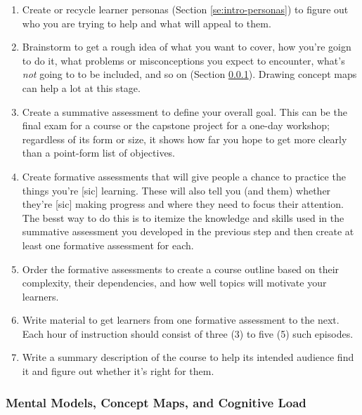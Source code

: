 \documentclass[010-intro.tex]{subfiles}
\begin{document}
        \begin{enumerate}[label=\textbf{L.\arabic*}]
            \item \label{enum:persona} Create or recycle learner personas (Section \ref{se:intro-personas})
                  to figure out who you are trying to help and what will appeal to them.
            \item \label{enum:brainstorm} Brainstorm to get a rough idea of what you want to cover,
                  how you're goign to do it,
                  what problems or misconceptions you expect to encounter,
                  what's \emph{not} going to to be included, and so on (Section \ref{sse:concept-maps}).
                  Drawing concept maps can help a lot at this stage.
            \item \label{enum:summative} Create a summative assessment to define your overall goal.
                  This can be the final exam for a course or the capstone project for a one-day workshop;
                  regardless of its form or size, it shows how far you hope to get more clearly than a point-form list of objectives.
            \item \label{enum:formative} Create formative assessments that will give people a chance to practice the things you're [sic] learning.
                  These will also tell you (and them) whether they're [sic] making progress and where they need to focus their attention.
                  The besst way to do this is to itemize the knowledge and skills used in the summative assessment you developed in the previous step
                  and then create at least one formative assessment for each.
            \item \label{enum:outline} Order the formative assessments to create a course outline based on
                  their complexity, their dependencies, and how well topics will motivate your learners.
            \item \label{enum:content} Write material to get learners from one formative assessment to the next.
                  Each hour of instruction should consist of three (3) to five (5) such episodes.
            \item \label{enum:summary} Write a summary description of the course to help its intended audience find it and figure out whether it's right for them.
        \end{enumerate}

    \subsubsection{Mental Models, Concept Maps, and Cognitive Load}
        \label{sse:concept-maps}
\end{document}
